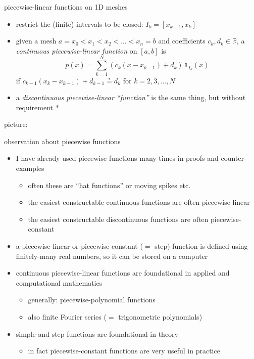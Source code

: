 \documentclass[10pt,
               svgnames,
               hyperref={colorlinks,
                         citecolor=DeepPink4,
                         linkcolor=FireBrick,
                         urlcolor=blue},
               usepdftitle=false]{beamer}
\newcommand{\RR}{\mathbb{R}}
\newcommand{\one}{\mathds{1}}
\begin{document}
\begin{frame}{piecewise-linear functions on 1D meshes}

\begin{itemize}
\item restrict the (finite) intervals to be closed: $I_k=[x_{k-1},x_k]$
\end{itemize}

\begin{definition}
\begin{itemize}
\item given a mesh $a=x_0<x_1<x_2<\dots<x_n=b$ and coefficients $c_k, d_k \in \RR$, a \emph{continuous piecewise-linear function} on $[a,b]$ is
     $$p(x) = \sum_{k=1}^N (c_k (x-x_{k-1}) + d_k) \, \one_{I_k}(x)$$
if $c_{k-1} (x_k-x_{k-1}) + d_{k-1} \stackrel{\ast}{=} d_k$ for $k=2,3,\dots,N$
\item a \emph{discontinuous piecewise-linear ``function''} is the same thing, but without requirement $\ast$
\end{itemize}
\end{definition}

\medskip
\noindent picture:

\vspace{30mm}
\end{frame}


\begin{frame}{observation about piecewise functions}

\begin{itemize}
\item I have already used piecewise functions many times in proofs and counter-examples
    \begin{itemize}
    \item[$\circ$] often these are ``hat functions'' or moving spikes etc.
    \item[$\circ$] the \alert{easiest constructable continuous functions} are often piecewise-linear
    \item[$\circ$]the \alert{easiest constructable discontinuous functions} are often piecewise-constant
    \end{itemize}
\item a piecewise-linear or piecewise-constant ($=$ step) function \alert{is defined using finitely-many real numbers}, so it can be stored on a computer
\item continuous piecewise-linear functions are foundational in applied and computational mathematics
    \begin{itemize}
    \item[$\circ$] generally: piecewise-polynomial functions
    \item[$\circ$] also finite Fourier series ($=$ trigonometric polynomials)
    \end{itemize}
\item simple and step functions are foundational in theory
    \begin{itemize}
    \item[$\circ$] in fact piecewise-constant functions are very useful in practice
    \end{itemize}
\end{itemize}
\end{frame}
\end{document}
